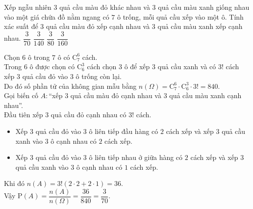 \begin{ex}%
	Xếp ngẫu nhiên $3$ quả cầu màu đỏ khác nhau và $3$ quả cầu màu xanh giống nhau vào một giá chứa đồ nằm ngang có $7$ ô trống, mỗi quả cầu xếp vào một ô. Tính xác suất để $3$ quả cầu màu đỏ xếp cạnh nhau và $3$ quả cầu màu xanh xếp cạnh nhau.
	\choice
	{\True $\dfrac{3}{70}$}
	{$\dfrac{3}{140}$}
	{$\dfrac{3}{80}$}
	{$\dfrac{3}{160}$}
	\loigiai
	{
		Chọn $6$ ô trong $7$ ô có $\mathrm{C}_7^6$ cách.\\
		Trong $6$ ô được chọn có $\mathrm{C}_6^3$ cách chọn $3$ ô để xếp $3$ quả cầu xanh và có $3!$ cách xếp $3$ quả cầu đỏ vào $3$ ô trống còn lại.\\
		Do đó số phần tử của không gian mẫu bằng $n(\Omega)=\mathrm{C}_7^6\cdot\mathrm{C}_6^3\cdot3!=840$.\\
		Gọi biến cố $A\colon$``xếp $3$ quả cầu màu đỏ cạnh nhau và $3$ quả cầu màu xanh cạnh nhau''.\\
		Đầu tiên xếp $3$ quả cầu đỏ cạnh nhau có $3!$ cách.
		\begin{itemize}
			\item Xếp $3$ quả cầu đỏ vào $3$ ô liên tiếp đầu hàng có $2$ cách xếp và xếp $3$ quả cầu xanh vào $3$ ô  cạnh nhau có $2$ cách xếp.
			\item Xếp $3$ quả cầu đỏ vào $3$ ô liên tiếp nhau ở giữa hàng có $2$ cách xếp và xếp $3$ quả cầu xanh vào $3$ ô  cạnh nhau có $1$ cách xếp.
		\end{itemize}
	Khi đó $n(A)=3!(2\cdot2+2\cdot1)=36$.\\
	Vậy $\mathrm{P}(A)=\dfrac{n(A)}{n(\Omega)}=\dfrac{36}{840}=\dfrac{3}{70}$.
	}
\end{ex}

